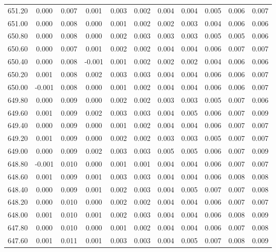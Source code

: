 \begin{longtable}{cccccccccc}
    651.20 &  0.000 &  0.007 &  0.001 &  0.003 &  0.002 &  0.004 &  0.004 &  0.005 &  0.006 &  0.007 \\
    651.00 &  0.000 &  0.008 &  0.000 &  0.001 &  0.002 &  0.002 &  0.003 &  0.004 &  0.006 &  0.006 \\
    650.80 &  0.000 &  0.008 &  0.000 &  0.002 &  0.003 &  0.003 &  0.003 &  0.005 &  0.005 &  0.006 \\
    650.60 &  0.000 &  0.007 &  0.001 &  0.002 &  0.002 &  0.004 &  0.004 &  0.006 &  0.007 &  0.007 \\
    650.40 &  0.000 &  0.008 & -0.001 &  0.001 &  0.002 &  0.002 &  0.002 &  0.004 &  0.006 &  0.006 \\
    650.20 &  0.001 &  0.008 &  0.002 &  0.003 &  0.003 &  0.004 &  0.004 &  0.006 &  0.006 &  0.007 \\
    650.00 & -0.001 &  0.008 &  0.000 &  0.001 &  0.002 &  0.004 &  0.004 &  0.006 &  0.006 &  0.007 \\
    649.80 &  0.000 &  0.009 &  0.000 &  0.002 &  0.002 &  0.003 &  0.003 &  0.005 &  0.007 &  0.006 \\
    649.60 &  0.001 &  0.009 &  0.002 &  0.003 &  0.003 &  0.004 &  0.005 &  0.006 &  0.007 &  0.009 \\
    649.40 &  0.000 &  0.009 &  0.000 &  0.001 &  0.002 &  0.004 &  0.004 &  0.006 &  0.007 &  0.007 \\
    649.20 &  0.001 &  0.009 &  0.000 &  0.002 &  0.002 &  0.003 &  0.003 &  0.005 &  0.007 &  0.007 \\
    649.00 &  0.000 &  0.009 &  0.002 &  0.003 &  0.003 &  0.005 &  0.005 &  0.006 &  0.007 &  0.009 \\
    648.80 & -0.001 &  0.010 &  0.000 &  0.001 &  0.001 &  0.004 &  0.004 &  0.006 &  0.007 &  0.007 \\
    648.60 &  0.001 &  0.009 &  0.001 &  0.003 &  0.003 &  0.004 &  0.004 &  0.006 &  0.008 &  0.008 \\
    648.40 &  0.000 &  0.009 &  0.001 &  0.002 &  0.003 &  0.004 &  0.005 &  0.007 &  0.007 &  0.008 \\
    648.20 &  0.000 &  0.010 &  0.000 &  0.002 &  0.002 &  0.004 &  0.004 &  0.006 &  0.007 &  0.007 \\
    648.00 &  0.001 &  0.010 &  0.001 &  0.002 &  0.003 &  0.004 &  0.004 &  0.006 &  0.008 &  0.009 \\
    647.80 &  0.000 &  0.010 &  0.000 &  0.001 &  0.002 &  0.004 &  0.004 &  0.006 &  0.007 &  0.008 \\
    647.60 &  0.001 &  0.011 &  0.001 &  0.003 &  0.003 &  0.004 &  0.005 &  0.007 &  0.008 &  0.009 \\

\end{longtable}
